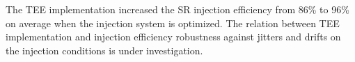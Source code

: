 \documentclass[a4paper,
               keeplastbox,   %
              nospread,     %
               ]{jacow}
\begin{document}


The TEE implementation increased the SR injection efficiency from 86\% to 96\% on average when the injection system is optimized. The relation between TEE implementation and injection efficiency robustness against jitters and drifts on the injection conditions is under investigation.
\end{document}
